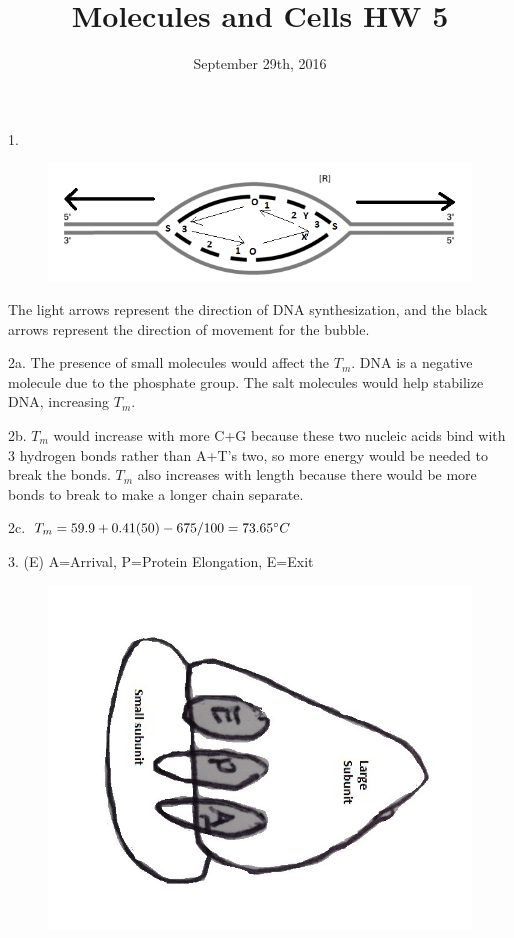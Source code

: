 \documentclass{article}
\title{Molecules and Cells HW 5}
\date{September 29th, 2016}
\begin{document}
\maketitle

1. \begin{figure}[h]
  \centering
 \includegraphics[scale=0.5]{P1.png}
\end{figure}
The light arrows represent the direction of DNA synthesization, and the black arrows represent the direction of movement for the bubble.

2a. The presence of small molecules would affect the $T_m$. DNA is a negative molecule due to the phosphate group. The salt molecules would help stabilize DNA, increasing $T_m$.

2b.	$T_m$ would increase with more C+G because these two nucleic acids bind with 3 hydrogen bonds rather than A+T's two, so more energy would be needed to break the bonds. $T_m$ also increases with length because there would be more bonds to break to make a longer chain separate.

2c. $T_m=59.9+0.41(50)-675/100=73.65\degree C$

3. (E) A=Arrival, P=Protein Elongation, E=Exit
\begin{figure}[h]
  \centering
 \includegraphics[scale=0.21]{P3.jpg}
\end{figure}
\end{document}

